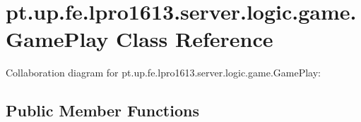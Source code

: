 \hypertarget{classpt_1_1up_1_1fe_1_1lpro1613_1_1server_1_1logic_1_1game_1_1_game_play}{}\section{pt.\+up.\+fe.\+lpro1613.\+server.\+logic.\+game.\+Game\+Play Class Reference}
\label{classpt_1_1up_1_1fe_1_1lpro1613_1_1server_1_1logic_1_1game_1_1_game_play}


Collaboration diagram for pt.\+up.\+fe.\+lpro1613.\+server.\+logic.\+game.\+Game\+Play\+:
\subsection*{Public Member Functions}
